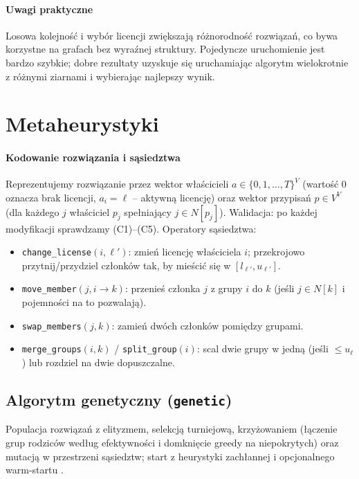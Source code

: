 \paragraph{Uwagi praktyczne}
Losowa kolejność i wybór licencji zwiększają różnorodność rozwiązań, co bywa korzystne na grafach bez wyraźnej struktury. Pojedyncze uruchomienie jest bardzo szybkie; dobre rezultaty uzyskuje się uruchamiając algorytm wielokrotnie z różnymi ziarnami i wybierając najlepszy wynik.

\section{Metaheurystyki}

\paragraph{Kodowanie rozwiązania i sąsiedztwa}
Reprezentujemy rozwiązanie przez wektor właścicieli $a\in\{0,1,\dots,T\}^V$ (wartość $0$ oznacza brak licencji, $a_i=\ell$ – aktywną licencję) oraz wektor przypisań $p\in V^V$ (dla każdego $j$ właściciel $p_j$ spełniający $j\in N[p_j]$). Walidacja: po każdej modyfikacji sprawdzamy (C1)–(C5). Operatory sąsiedztwa:
\begin{itemize}
  \item \texttt{change\_license}$(i,\ell')$: zmień licencję właściciela $i$; przekrojowo przytnij/przydziel członków tak, by mieścić się w $[l_{\ell'},u_{\ell'}]$.
  \item \texttt{move\_member}$(j,i\to k)$: przenieś członka $j$ z grupy $i$ do $k$ (jeśli $j\in N[k]$ i pojemności na to pozwalają).
  \item \texttt{swap\_members}$(j,k)$: zamień dwóch członków pomiędzy grupami.
  \item \texttt{merge\_groups}$(i,k)$ / \texttt{split\_group}$(i)$: scal dwie grupy w jedną (jeśli $\le u_\ell$) lub rozdziel na dwie dopuszczalne.
\end{itemize}

\subsection{Algorytm genetyczny (\texttt{genetic})}\label{subsec:ga}
Populacja rozwiązań z elityzmem, selekcją turniejową, krzyżowaniem (łączenie grup rodziców według efektywności i domknięcie greedy na niepokrytych) oraz mutacją w przestrzeni sąsiedztw; start z heurystyki zachłannej i opcjonalnego warm‑startu \cite{holland1975,goldberg1989}.

